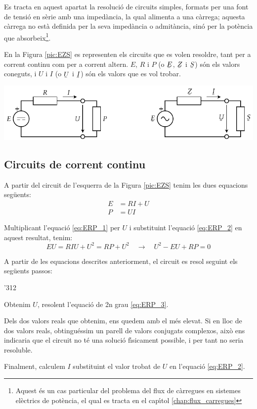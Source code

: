 Es tracta en aquest apartat la resoluci\'{o} de circuits simples,
formats per una font de tensi\'{o} en s\`{e}rie amb una imped\`{a}ncia, la qual
alimenta a una c\`{a}rrega; aquesta c\`{a}rrega no est\`{a} definida per la seva
imped\`{a}ncia o admit\`{a}ncia, sin\'{o} per la pot\`{e}ncia que absorbeix\footnote{Aquest \'{e}s un cas particular
del problema del flux de c\`{a}rregues en
sistemes el\`{e}ctrics de pot\`{e}ncia, el qual es tracta en el cap\'{\i}tol \ref{chap:flux_carregues}}.

En la Figura \vref{pic:EZS} es representen els circuits que es volen
resoldre, tant per a corrent continu com per a corrent altern. $E$,
$R$ i $P$ (o $\cmplx{E}$, $\cmplx{Z}$ i $\cmplx{S}$) s\'{o}n els valors
coneguts, i $U$ i $I$ (o $\cmplx{U}$ i $\cmplx{I}$) s\'{o}n els valors
que es vol trobar.

\begin{center}
   \includegraphics{Imatges/Cap-CalcBas-EZS.pdf}
     \label{pic:EZS}
\end{center}

\subsection{Circuits de corrent continu}

A partir del circuit de l'esquerra de la Figura \vref{pic:EZS} tenim les dues equacions seg\"{u}ents:
\begin{align}
   E &= R I + U \label{eq:ERP_1} \\
   P &= U I     \label{eq:ERP_2}
\end{align}

Multiplicant l'equaci\'{o} \eqref{eq:ERP_1} per $U$ i substituint l'equaci\'{o} \eqref{eq:ERP_2} en aquest resultat, tenim:
\begin{equation}
   E U = R I U + U^2 = R P + U^2 \quad \rightarrow \quad U^2 - E U + R P = 0 \label{eq:ERP_3}
\end{equation}

A partir de les equacions descrites anteriorment, el circuit es resol seguint els seg\"{u}ents passos:
\begin{dingautolist}{'312}
   \item Obtenim $U$, resolent l'equaci\'{o} de 2n grau \eqref{eq:ERP_3}.
   \item Dels dos valors reals que obtenim, ens quedem amb el m\'{e}s elevat. Si en lloc de dos valors reals, obtingu\'{e}ssim
   un parell de valors conjugats complexos, aix\`{o} ens indicaria que el circuit no t\'{e} una soluci\'{o} f\'{\i}sicament possible, i per tant no seria resoluble.
   \item Finalment, calculem $I$ substituint el valor trobat de $U$ en l'equaci\'{o} \eqref{eq:ERP_2}.
\end{dingautolist}

